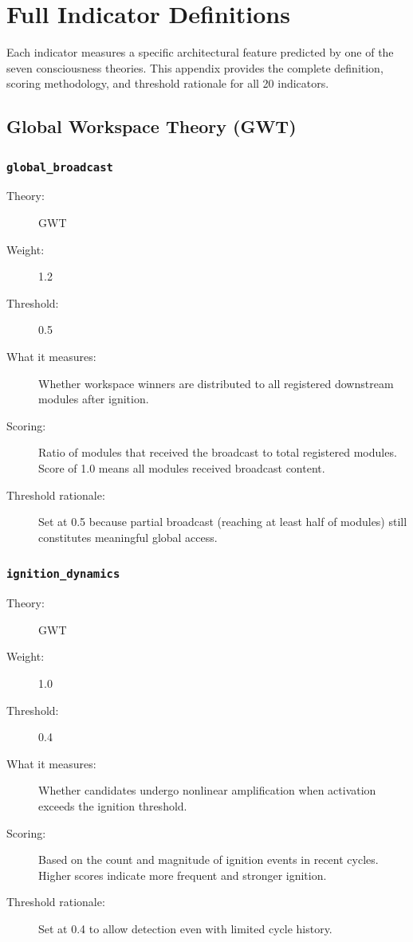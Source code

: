 \section{Full Indicator Definitions}\label{app:indicators}

Each indicator measures a specific architectural feature predicted by one of the seven consciousness theories.
This appendix provides the complete definition, scoring methodology, and threshold rationale for all 20 indicators.

\subsection{Global Workspace Theory (GWT)}

\subsubsection{\texttt{global\_broadcast}}
\begin{description}
  \item[Theory:] GWT \cite{baars1988,dehaene2001}
  \item[Weight:] 1.2
  \item[Threshold:] 0.5
  \item[What it measures:] Whether workspace winners are distributed to all registered downstream modules after ignition.
  \item[Scoring:] Ratio of modules that received the broadcast to total registered modules. Score of 1.0 means all modules received broadcast content.
  \item[Threshold rationale:] Set at 0.5 because partial broadcast (reaching at least half of modules) still constitutes meaningful global access.
\end{description}

\subsubsection{\texttt{ignition\_dynamics}}
\begin{description}
  \item[Theory:] GWT \cite{dehaene2001}
  \item[Weight:] 1.0
  \item[Threshold:] 0.4
  \item[What it measures:] Whether candidates undergo nonlinear amplification when activation exceeds the ignition threshold.
  \item[Scoring:] Based on the count and magnitude of ignition events in recent cycles. Higher scores indicate more frequent and stronger ignition.
  \item[Threshold rationale:] Set at 0.4 to allow detection even with limited cycle history.
\end{description}

